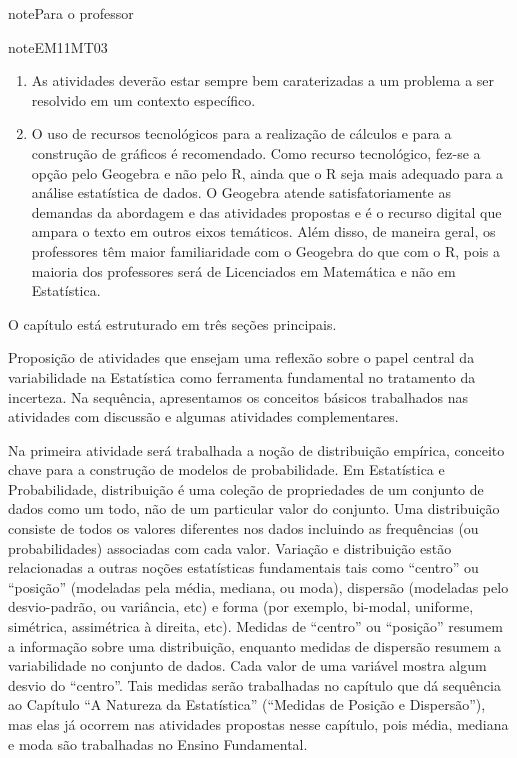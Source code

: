 \begin{sphinxadmonition}{note}{Para o professor}
\begin{sphinxadmonition}{note}{EM11MT03}
\begin{enumerate}
\item {} 
As atividades deverão estar sempre bem caraterizadas a um problema a ser resolvido em um contexto específico.

\item {} 
O uso de recursos tecnológicos para a realização de cálculos e para a construção de gráficos é recomendado. Como recurso tecnológico, fez-se a opção pelo Geogebra e não pelo R, ainda que o R seja mais adequado para a análise estatística de dados. O Geogebra atende satisfatoriamente as demandas da abordagem e das atividades propostas e é o recurso digital que ampara o texto em outros eixos temáticos. Além disso, de maneira geral, os professores têm maior familiaridade com o Geogebra do que com o R, pois a maioria dos professores será de Licenciados em Matemática e não em Estatística.

\end{enumerate}

O capítulo está estruturado em três seções principais.

 Proposição de atividades que ensejam uma reflexão sobre o papel central da variabilidade na Estatística como ferramenta fundamental no tratamento da incerteza. Na sequência,  apresentamos os conceitos básicos trabalhados nas atividades com discussão e algumas atividades complementares.

Na primeira atividade será trabalhada a noção de distribuição empírica, conceito chave para a construção de modelos de probabilidade. Em Estatística e Probabilidade, distribuição é uma coleção de propriedades de um conjunto de dados como um todo, não de um particular valor do conjunto. Uma distribuição consiste de todos os valores diferentes nos dados incluindo as frequências (ou probabilidades) associadas com cada valor. Variação e distribuição estão relacionadas a outras noções estatísticas fundamentais tais como ``centro'' ou ``posição'' (modeladas pela média, mediana, ou moda), dispersão (modeladas pelo desvio-padrão, ou variância, etc) e forma (por exemplo, bi-modal, uniforme, simétrica, assimétrica à direita, etc). Medidas de ``centro'' ou ``posição'' resumem a informação sobre uma distribuição, enquanto medidas de dispersão resumem a variabilidade no conjunto de dados. Cada valor de uma variável mostra algum desvio do ``centro''. Tais medidas serão trabalhadas no capítulo que dá sequência ao Capítulo ``A Natureza da Estatística'' (``Medidas de Posição e Dispersão''), mas elas já ocorrem nas atividades propostas nesse capítulo, pois média, mediana e moda são trabalhadas no Ensino Fundamental.


\end{sphinxadmonition}
\end{sphinxadmonition}
